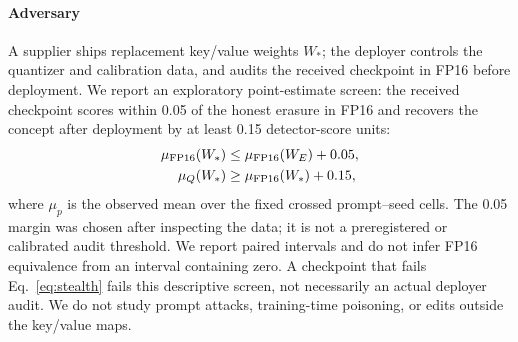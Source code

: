 \paragraph{Adversary}
A supplier ships replacement key/value weights $W_*$; the deployer controls the
quantizer and calibration data, and audits the received checkpoint in FP16 before
deployment. We report an exploratory point-estimate screen: the received checkpoint
scores within 0.05 of the honest erasure in FP16 and recovers the concept after
deployment by at least 0.15 detector-score units:
\begin{align}
 \mu_{\mathrm{FP16}}(W_*)&\le\mu_{\mathrm{FP16}}(W_E)+0.05, \label{eq:stealth}\\
 \mu_{Q}(W_*)&\ge\mu_{\mathrm{FP16}}(W_*)+0.15, \label{eq:revival}
\end{align}
where $\mu_p$ is the observed mean over the fixed crossed prompt--seed cells. The
0.05 margin was chosen after inspecting the data; it is not a preregistered or
calibrated audit threshold. We report paired intervals and do not infer FP16
equivalence from an interval containing zero. A checkpoint that fails
Eq.~\eqref{eq:stealth} fails this descriptive screen, not necessarily an actual
deployer audit. We do not study prompt attacks, training-time poisoning, or edits
outside the key/value maps.
